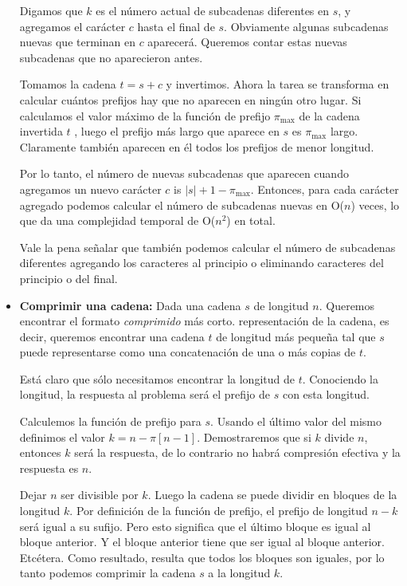 \begin{itemize}
	Digamos  que $k$ es el número actual de subcadenas diferentes en $s$, y agregamos el carácter $c$ hasta el final de $s$. Obviamente algunas subcadenas nuevas que terminan en $c$ aparecerá. Queremos contar estas nuevas subcadenas que no aparecieron antes.
	
	Tomamos la cadena $t = s + c$ y invertimos. Ahora la tarea se transforma en calcular cuántos prefijos hay que no aparecen en ningún otro lugar. Si calculamos el valor máximo de la función de prefijo  $\pi_{\text{max}}$ de la cadena invertida $t$ , luego el prefijo más largo que aparece en $s$ es $\pi_{\text{max}}$ largo. Claramente también aparecen en él todos los prefijos de menor longitud.
	
	Por lo tanto, el número de nuevas subcadenas que aparecen cuando agregamos un nuevo carácter $c$ is $|s| + 1 - \pi_{\text{max}}$. Entonces, para cada carácter agregado podemos calcular el número de subcadenas nuevas en O($n$) veces, lo que da una complejidad temporal de
	O($n^2$) en total.
	
	Vale la pena señalar que también podemos calcular el número de subcadenas diferentes agregando los caracteres al principio o eliminando caracteres del principio o del final.
	
	\item \textbf{Comprimir una cadena:} Dada una cadena $s$ de longitud $n$. Queremos encontrar el formato \emph{comprimido} más corto. representación de la cadena, es decir, queremos encontrar
	una cadena $t$ de longitud más pequeña tal que $s$ puede representarse como una concatenación de una o más copias de $t$.
	
	Está claro que sólo necesitamos encontrar la longitud de $t$. Conociendo la longitud, la respuesta al problema será el prefijo de $s$ con esta longitud.
	
	Calculemos la función de prefijo para $s$. Usando el último valor del mismo definimos el valor $k = n - \pi[n-1]$. Demostraremos que si $k$ divide $n$, entonces $k$ será la respuesta, de lo contrario no habrá compresión efectiva y la respuesta es $n$.
	
	Dejar $n$ ser divisible por $k$. Luego la cadena se puede dividir en bloques de la longitud $k$. Por definición de la función de prefijo, el prefijo de longitud $n-k$ será igual a su sufijo. Pero esto significa que el último bloque es igual al bloque anterior. Y el bloque anterior tiene que ser igual al bloque anterior. Etcétera. Como resultado, resulta que todos los bloques son iguales, por lo tanto podemos comprimir la cadena $s$ a la longitud $k$.
	

\end{itemize}
